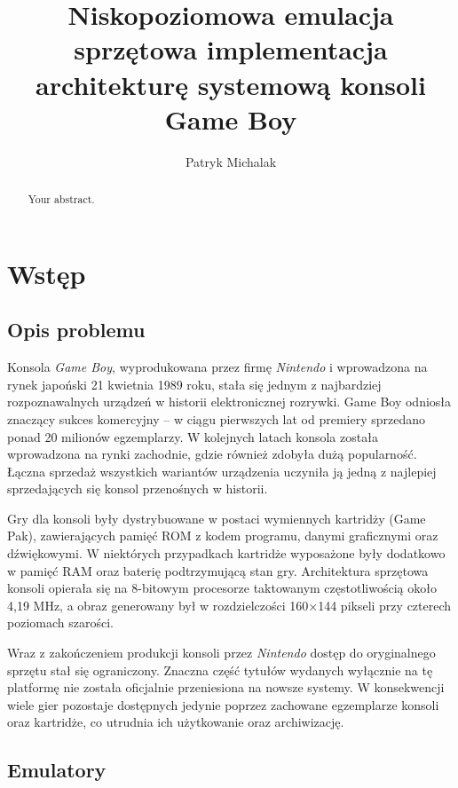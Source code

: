 \documentclass{article}
\title{Niskopoziomowa emulacja sprzętowa implementacja architekturę systemową konsoli Game Boy}
\author{Patryk Michalak}
\begin{document}
	\maketitle
	
	\begin{abstract}
		Your abstract.
	\end{abstract}
	
\clearpage
	\tableofcontents
	\clearpage
\section{Wstęp}

\subsection{Opis problemu}

Konsola \textit{Game Boy}, wyprodukowana przez firmę \textit{Nintendo} i wprowadzona na rynek japoński 21 kwietnia 1989 roku, stała się jednym z najbardziej rozpoznawalnych urządzeń w historii elektronicznej rozrywki. Game Boy odniosła znaczący sukces komercyjny – w ciągu pierwszych lat od premiery sprzedano ponad 20 milionów egzemplarzy. W kolejnych latach konsola została wprowadzona na rynki zachodnie, gdzie również zdobyła dużą popularność. Łączna sprzedaż wszystkich wariantów urządzenia uczyniła ją jedną z najlepiej sprzedających się konsol przenośnych w historii.

Gry dla konsoli były dystrybuowane w postaci wymiennych kartridży (Game Pak), zawierających pamięć ROM z kodem programu, danymi graficznymi oraz dźwiękowymi. W niektórych przypadkach kartridże wyposażone były dodatkowo w pamięć RAM oraz baterię podtrzymującą stan gry. Architektura sprzętowa konsoli opierała się na 8-bitowym procesorze taktowanym częstotliwością około 4,19 MHz, a obraz generowany był w rozdzielczości 160×144 pikseli przy czterech poziomach szarości.

Wraz z zakończeniem produkcji konsoli przez \textit{Nintendo} dostęp do oryginalnego sprzętu stał się ograniczony. Znaczna część tytułów wydanych wyłącznie na tę platformę nie została oficjalnie przeniesiona na nowsze systemy. W konsekwencji wiele gier pozostaje dostępnych jedynie poprzez zachowane egzemplarze konsoli oraz kartridże, co utrudnia ich użytkowanie oraz archiwizację.

\subsection{Emulatory}
\end{document}
